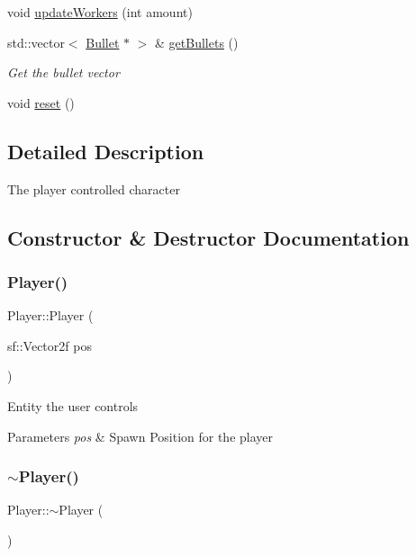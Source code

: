 \begin{DoxyCompactItemize}
void \mbox{\hyperlink{class_player_a1a6ae384266f1d99c9333a011d7259a5}{update\+Workers}} (int amount)
\item 
std\+::vector$<$ \mbox{\hyperlink{class_bullet}{Bullet}} $\ast$ $>$ \& \mbox{\hyperlink{class_player_a4ad45c4c8298531f45ebed48ce001373}{get\+Bullets}} ()
\begin{DoxyCompactList}\small\item\em Get the bullet vector \end{DoxyCompactList}\item 
void \mbox{\hyperlink{class_player_a1af5d39f7bac2aeaa1e30c7dda2332fa}{reset}} ()
\end{DoxyCompactItemize}


\subsection{Detailed Description}
The player controlled character 



\subsection{Constructor \& Destructor Documentation}
\mbox{\label{class_player_a590f9fa9624d8734027fa2b290fa909e}} 
\subsubsection{\texorpdfstring{Player()}{Player()}}
{\footnotesize\ttfamily Player\+::\+Player (\begin{DoxyParamCaption}\item[{sf\+::\+Vector2f}]{pos }\end{DoxyParamCaption})}



Entity the user controls 


\begin{DoxyParams}{Parameters}
{\em pos} & Spawn Position for the player\\
\hline
\end{DoxyParams}
\mbox{\label{class_player_a749d2c00e1fe0f5c2746f7505a58c062}} 
\subsubsection{\texorpdfstring{$\sim$Player()}{~Player()}}
{\footnotesize\ttfamily Player\+::$\sim$\+Player (\begin{DoxyParamCaption}{ }\end{DoxyParamCaption})}



